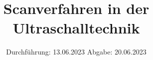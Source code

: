 

\subject{VERSUCH NUMMER US1}
\title{Scanverfahren in der Ultraschalltechnik}
\date{
  Durchführung: 13.06.2023
  \hspace{3em}
  Abgabe: 20.06.2023
}



\maketitle
\thispagestyle{empty}
\tableofcontents
\newpage
\setcounter{page}{1}







\newpage
\printbibliography
\nocite{apus1}
\nocite{matplotlib}
\nocite{numpy}
\nocite{scipy}
\nocite{uncertainties}
\nocite{reback2020pandas}

\newpage





